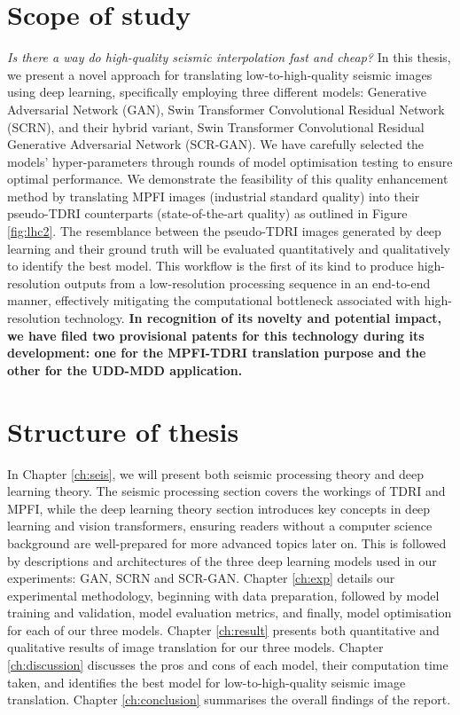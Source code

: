 \section{Scope of study}
\textit{Is there a way do high-quality seismic interpolation fast and cheap?} In this thesis, we present a novel approach for translating low-to-high-quality seismic images using deep learning, specifically employing three different models: Generative Adversarial Network (GAN), Swin Transformer Convolutional Residual Network (SCRN), and their hybrid variant, Swin Transformer Convolutional Residual Generative Adversarial Network (SCR-GAN). We have carefully selected the models' hyper-parameters through rounds of model optimisation testing to ensure optimal performance. We demonstrate the feasibility of this quality enhancement method by translating MPFI images (industrial standard quality) into their pseudo-TDRI counterparts (state-of-the-art quality) as outlined in Figure \ref{fig:lhc2}. The resemblance between the pseudo-TDRI images generated by deep learning and their ground truth will be evaluated quantitatively and qualitatively to identify the best model. This workflow is the first of its kind to produce high-resolution outputs from a low-resolution processing sequence in an end-to-end manner, effectively mitigating the computational bottleneck associated with high-resolution technology. \textbf{In recognition of its novelty and potential impact, we have filed two provisional patents for this technology during its development: one for the MPFI-TDRI translation purpose and the other for the UDD-MDD application.}

\section{Structure of thesis}
In Chapter \ref{ch:seis}, we will present both seismic processing theory and deep learning theory. The seismic processing section covers the workings of TDRI and MPFI, while the deep learning theory section introduces key concepts in deep learning and vision transformers, ensuring readers without a computer science background are well-prepared for more advanced topics later on. This is followed by descriptions and architectures of the three deep learning models used in our experiments: GAN, SCRN and SCR-GAN. Chapter \ref{ch:exp} details our experimental methodology, beginning with data preparation, followed by model training and validation, model evaluation metrics, and finally, model optimisation for each of our three models. Chapter \ref{ch:result}  presents both quantitative and qualitative results of image translation for our three models. Chapter \ref{ch:discussion} discusses the pros and cons of each model, their computation time taken, and identifies the best model for low-to-high-quality seismic image translation. Chapter \ref{ch:conclusion} summarises the overall findings of the report.